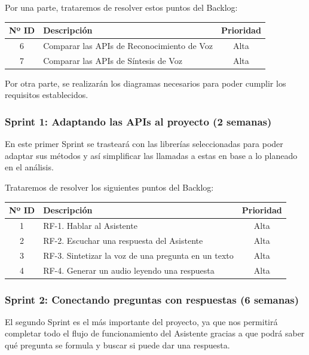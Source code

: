 Por una parte, trataremos de resolver estos puntos del Backlog:

\begin{table}[H]
	\begin{tabularx}{\textwidth}{|c|X|c|}
		\hline
		{\cellcolor{mintgreen}} \textbf{Nº ID} & {\cellcolor{mintgreen}} \textbf{Descripción} & {\cellcolor{mintgreen}} \textbf{Prioridad} \\
		\hline
		6 &  Comparar las APIs de Reconocimiento de Voz & Alta \\
		\hline
		7 &  Comparar las APIs de Síntesis de Voz & Alta \\
		\hline
	\end{tabularx}
\end{table}

Por otra parte, se realizarán los diagramas necesarios para poder cumplir los requisitos establecidos.

\subsubsection{Sprint 1: Adaptando las APIs al proyecto (2 semanas)}
En este primer Sprint se trasteará con las librerías seleccionadas para poder adaptar sus métodos y así simplificar las llamadas a estas en base a lo planeado en el análisis.

Trataremos de resolver los siguientes puntos del Backlog:

\begin{table}[H]
	\begin{tabularx}{\textwidth}{|c|X|c|}
		\hline
		{\cellcolor{mintgreen}} \textbf{Nº ID} & {\cellcolor{mintgreen}} \textbf{Descripción} & {\cellcolor{mintgreen}} \textbf{Prioridad} \\
		\hline
		1 & RF-1. Hablar al Asistente & Alta \\
		\hline
		2 & RF-2. Escuchar una respuesta del Asistente & Alta \\
		\hline
		3 & RF-3. Sintetizar la voz de una pregunta en un texto & Alta \\
		\hline
		4 & RF-4. Generar un audio leyendo una respuesta & Alta \\
		\hline
	\end{tabularx}
\end{table}

\subsubsection{Sprint 2: Conectando preguntas con respuestas (6 semanas)}
El segundo Sprint es el más importante del proyecto, ya que nos permitirá completar todo el flujo de funcionamiento del Asistente gracias a que podrá saber qué pregunta se formula y buscar si puede dar una respuesta.

